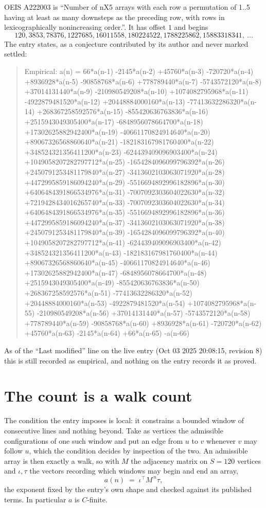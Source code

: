 \documentclass[11pt,a4paper]{article}
\theoremstyle{plain}
\theoremstyle{definition}
\begin{document}
OEIS A222003 is ``Number of nX5 arrays with each row a permutation of 1..5 having at least as many downsteps as the preceding row, with rows in lexicographically nonincreasing order.''. It has offset $1$ and begins
\[
120, 3853, 78376, 1227685, 16011558, 180224522, 1788225862, 15883318341,\ \dots
\]
The entry states, as a conjecture contributed by its author and never marked settled:
\begin{quote}
Empirical: a(n) = 66*a(n-1) -2145*a(n-2) +45760*a(n-3) -720720*a(n-4) +8936928*a(n-5) -90858768*a(n-6) +778789440*a(n-7) -5743572120*a(n-8) +37014131440*a(n-9) -210980549208*a(n-10) +1074082795968*a(n-11) -4922879481520*a(n-12) +20448884000160*a(n-13) -77413632286320*a(n-14) +268367258592576*a(n-15) -855420636763836*a(n-16) +2515943049305400*a(n-17) -6848956078664700*a(n-18) +17302625882942400*a(n-19) -40661170824914640*a(n-20) +89067326568860640*a(n-21) -182183167981760400*a(n-22) +348524321356411200*a(n-23) -624439409096903400*a(n-24) +1049058207282797712*a(n-25) -1654284096099796392*a(n-26) +2450791253481179840*a(n-27) -3413602103063071920*a(n-28) +4472995859186094240*a(n-29) -5516694892996182896*a(n-30) +6406484391866534976*a(n-31) -7007092303604022630*a(n-32) +7219428434016265740*a(n-33) -7007092303604022630*a(n-34) +6406484391866534976*a(n-35) -5516694892996182896*a(n-36) +4472995859186094240*a(n-37) -3413602103063071920*a(n-38) +2450791253481179840*a(n-39) -1654284096099796392*a(n-40) +1049058207282797712*a(n-41) -624439409096903400*a(n-42) +348524321356411200*a(n-43) -182183167981760400*a(n-44) +89067326568860640*a(n-45) -40661170824914640*a(n-46) +17302625882942400*a(n-47) -6848956078664700*a(n-48) +2515943049305400*a(n-49) -855420636763836*a(n-50) +268367258592576*a(n-51) -77413632286320*a(n-52) +20448884000160*a(n-53) -4922879481520*a(n-54) +1074082795968*a(n-55) -210980549208*a(n-56) +37014131440*a(n-57) -5743572120*a(n-58) +778789440*a(n-59) -90858768*a(n-60) +8936928*a(n-61) -720720*a(n-62) +45760*a(n-63) -2145*a(n-64) +66*a(n-65) -a(n-66)
\end{quote}
As of the ``Last modified'' line on the live entry (Oct 03 2025 20:08:15, revision 8) this is still
recorded as empirical, and nothing on the entry records it as proved.

\section{The count is a walk count}

The condition the entry imposes is local: it constrains a bounded window of consecutive lines and nothing beyond. Take as
vertices the admissible configurations of one such window and put an edge from $u$ to $v$
whenever $v$ may follow $u$, which the condition decides by inspection of the two. An
admissible array is then exactly a walk, so with $M$ the adjacency matrix on $S=120$ vertices
and $\iota,\tau$ the vectors recording which windows may begin and end an array,
\[
a(n)\;=\;\iota^{\!\top}M^{\,n}\tau ,
\]
the exponent fixed by the entry's own shape and checked against its published terms. In
particular $a$ is $C$-finite.
\end{document}
